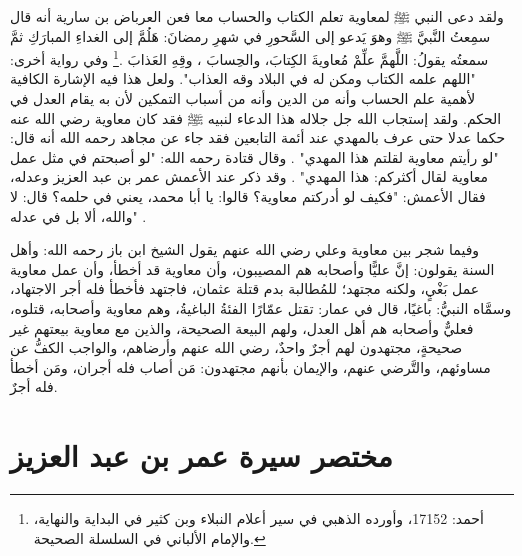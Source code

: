 ولقد دعى النبي ﷺ  لمعاوية تعلم الكتاب والحساب معا فعن العرباض بن سارية أنه قال سمِعتُ النَّبيَّ ﷺ وهوَ يَدعو إلى السَّحورِ في شهرِ رمضانَ: هَلُمَّ إلى الغداءِ المبارَكِ ثمَّ سمعتُه يقولُ: اللَّهمَّ علِّمْ مُعاويةَ الكِتابَ، والحِسابَ ، وقِهِ العَذابَ \href{https://shamela.ws/book/25794/13683#p2}{\faExternalLink}\href{https://shamela.ws/book/22669/1909#p2}{\faExternalLink}\href{https://shamela.ws/book/4445/6628#p1}{\faExternalLink}\href{https://shamela.ws/book/9442/5496#p12}{\faExternalLink} \cite{ahmid}\cite{dahabi_Siyar}\cite{ibnKathir_AlBidayah}\cite{albani_Sahiha}.\footnote{أحمد: 17152، وأورده الذهبي في سير أعلام النبلاء وبن كثير في البداية والنهاية، والإمام الألباني في السلسلة الصحيحة.} وفي رواية أخرى: "اللهم علمه الكتاب ومكن له في البلاد وقه العذاب". ولعل هذا فيه الإشارة الكافية لأهمية علم الحساب وأنه من الدين وأنه من أسباب التمكين لأن به يقام العدل في الحكم. ولقد إستجاب الله جل جلاله هذا الدعاء لنبيه ﷺ فقد كان معاوية رضي الله عنه حكما عدلا حتى عرف بالمهدي عند أئمة التابعين فقد جاء عن مجاهد رحمه الله أنه قال: "لو رأيتم معاوية لقلتم هذا المهدي" \href{https://shamela.ws/book/1077/702#p1}{\faExternalLink}. وقال قتادة رحمه الله: "لو أصبحتم في مثل عمل معاوية لقال أكثركم: هذا المهدي" \href{https://shamela.ws/book/1077/701#p1}{\faExternalLink}. وقد ذكر عند الأعمش عمر بن عبد العزيز وعدله، فقال الأعمش: "فكيف لو أدركتم معاوية؟ قالوا: يا أبا محمد، يعني في حلمه؟ قال: لا والله، ألا بل في عدله" \href{https://shamela.ws/book/1077/700#p1}{\faExternalLink}\href{https://shamela.ws/book/927/3063#p3}{\faExternalLink}.


وفيما شجر بين معاوية وعلي رضي الله عنهم يقول الشيخ ابن باز رحمه الله: وأهل السنة يقولون: إنَّ عليًّا وأصحابه هم المصيبون، وأن معاوية قد أخطأ، وأن عمل معاوية عمل بَغْيٍ، ولكنه مجتهد؛ للمُطالبة بدم قتلة عثمان، فاجتهد فأخطأ فله أجر الاجتهاد، وسمَّاه النبيُّ: باغيًا، قال في عمار: تقتل عمّارًا الفئةُ الباغيةُ، وهم معاوية وأصحابه، قتلوه، فعليٌّ وأصحابه هم أهل العدل، ولهم البيعة الصحيحة، والذين مع معاوية بيعتهم غير صحيحةٍ، مجتهدون لهم أجرٌ واحدٌ، رضي الله عنهم وأرضاهم، والواجب الكفُّ عن مساوئهم، والتَّرضي عنهم، والإيمان بأنهم مجتهدون: مَن أصاب فله أجران، ومَن أخطأ فله أجرٌ.


\section{مختصر سيرة عمر بن عبد العزيز}

